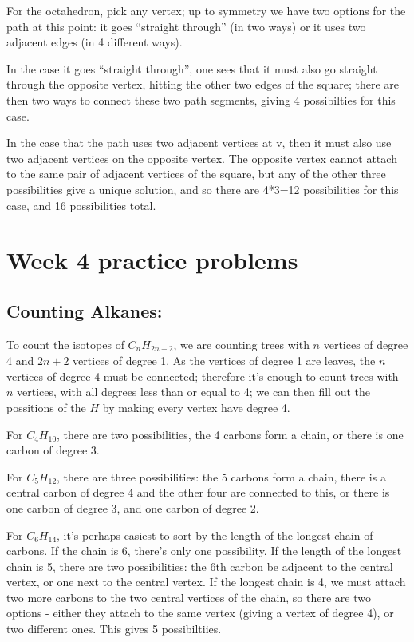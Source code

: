 \documentclass{amsart}
\begin{document}
For the octahedron, pick any vertex; up to symmetry we have two options for the path at this point: it goes ``straight through'' (in two ways) or it uses two adjacent edges (in 4 different ways).

In the case it goes ``straight through'', one sees that it must also go straight through the opposite vertex, hitting the other two edges of the square; there are then two ways to connect these two path segments, giving 4 possibilties for this case.

In the case that the path uses two adjacent vertices at v, then it must also use two adjacent vertices on the opposite vertex.  The opposite vertex cannot attach to the same pair of adjacent vertices of the square, but any of the other three possibilities give a unique solution, and so there are 4*3=12 possibilities for this case, and 16 possibilities total.  


\section{Week 4 practice problems}

\subsection{Counting Alkanes:}
To count the isotopes of $C_nH_{2n+2}$, we are counting trees with $n$ vertices of degree 4 and $2n+2$ vertices of degree 1.  As the vertices of degree 1 are leaves, the $n$ vertices of degree 4 must be connected; therefore it's enough to count trees with $n$ vertices, with all degrees less than or equal to 4; we can then fill out the possitions of the $H$ by making every vertex have degree 4.

For $C_4H_{10}$, there are two possibilities, the 4 carbons form a chain, or there is one carbon of degree 3.

For $C_5H_{12}$, there are three possibilities: the 5 carbons form a chain, there is a central carbon of degree 4 and the other four are connected to this, or there is one carbon of degree 3, and one carbon of degree 2.

For $C_6 H_{14}$, it's perhaps easiest to sort by the length of the longest chain of carbons.  If the chain is 6, there's only one possibility.  If the length of the longest chain is 5, there are two possibilities: the 6th carbon be adjacent to the central vertex, or one next to the central vertex.  If the longest chain is 4, we must attach two more carbons to the two central vertices of the chain, so there are two options - either they attach to the same vertex (giving a vertex of degree 4), or two different ones.  This gives 5 possibiltiies.
\end{document}
